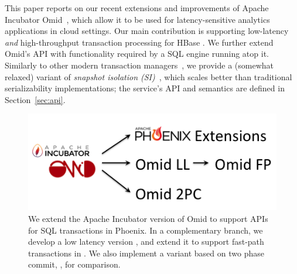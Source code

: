 This paper reports on our recent extensions and improvements of Apache Incubator Omid~\cite{omid},
which allow it to be used for latency-sensitive analytics applications in cloud settings. 
Our main contribution is supporting low-latency {\em and\/} high-throughput transaction processing  for HBase 
.  
We further extend Omid's API with functionality required by a SQL engine running atop it.
Similarly to other modern transaction managers~\cite{Percolator2010,Spanner2012,Omid2017,tephra,cockroach},
we provide a (somewhat relaxed) variant of \emph{snapshot isolation (SI)}~\cite{DBLP:conf/sigmod/BerensonBGMOO95},
which scales better than traditional serializability implementations; the service's API and semantics are defined in  Section~\ref{sec:api}.  


\begin{figure}
  \centerline{
        \includegraphics[width=0.75\columnwidth]{figs/OmidVersions}	
  }
\caption{
              We extend the  Apache Incubator version of Omid to support APIs  for SQL transactions in Phoenix. 
              In a complementary branch,
              we develop a low latency version \sysll, and extend it to support fast-path transactions in \sys.
              We also implement a variant based on two phase commit, \syspc, for comparison.}
\label{fig:evolution}
\end{figure}

